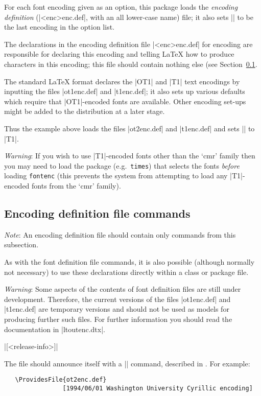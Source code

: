 \documentclass{ltxguide}[1995/11/28]
\begin{document}
For each font encoding  given as an option, this package loads
the \emph{encoding definition} (|<enc>enc.def|, with an all
lower-case name) file; it also sets |\encodingdefault| to be the last
encoding in the option list.
 
The declarations in the encoding definition file |<enc>enc.def| for
encoding  are responsible for declaring this encoding and
telling \LaTeX{} how to produce characters in this encoding; this file
should contain nothing else (see Section~\ref{Sec:encode.def}.

The standard \LaTeX{} format declares the |OT1| and |T1| text
encodings by inputting the files |ot1enc.def| and |t1enc.def|; it also
sets up various defaults which require that |OT1|-encoded fonts are
available.
Other encoding set-ups might be added to the distribution at a
later stage.
 
Thus the example above loads the files |ot2enc.def| and |t1enc.def|
and sets |\encodingdefault| to |T1|.

\emph{Warning}: If you wish to use |T1|-encoded fonts other than the `cmr'
family then you may need to load the package (e.g.~\texttt{times})
that selects the fonts \emph{before} loading \texttt{fontenc} (this
prevents the system from attempting to load any |T1|-encoded fonts from
the `cmr' family).

\subsection{Encoding definition file commands}
\label{Sec:encode.def}
 
\emph{Note}: An encoding definition file should contain only commands
from this subsection.

As with the font definition file commands, it is also possible
(although normally not necessary) to use these declarations directly
within a class or package file.

\emph{Warning}: Some aspects of the contents of font definition files
are still under development.  Therefore, the current versions of the
files |ot1enc.def| and |t1enc.def| are temporary versions and should
not be used as models for producing further such files.  For further
information you should read the documentation in |ltoutenc.dtx|.
 
\begin{decl}
   |[<release-info>]|
\end{decl}
The file should announce itself with a |\ProvidesFile|
command, described in \emph{\clsguide}.  For example:
\begin{verbatim}
   \ProvidesFile{ot2enc.def}
                [1994/06/01 Washington University Cyrillic encoding]
\end{verbatim}
 
\end{document}
